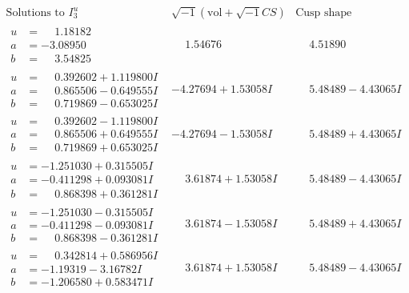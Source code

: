 \documentclass[1p]{elsarticle_modified}
\theoremstyle{definition}
\newcommand{\I}{\sqrt{-1}}
\begin{document}
$$\begin{array}{c|c|c}  
\text{Solutions to }I^u_{3}& \I (\text{vol} + \sqrt{-1}CS) & \text{Cusp shape}\\
 \hline 
\begin{aligned}
u &= \phantom{-}1.18182\phantom{ +0.000000I} \\
a &= -3.08950\phantom{ +0.000000I} \\
b &= \phantom{-}3.54825\phantom{ +0.000000I}\end{aligned}
 & \phantom{-}1.54676\phantom{ +0.000000I} & \phantom{-}4.51890\phantom{ +0.000000I} \\ \hline\begin{aligned}
u &= \phantom{-}0.392602 + 1.119800 I \\
a &= \phantom{-}0.865506 - 0.649555 I \\
b &= \phantom{-}0.719869 - 0.653025 I\end{aligned}
 & -4.27694 + 1.53058 I & \phantom{-}5.48489 - 4.43065 I \\ \hline\begin{aligned}
u &= \phantom{-}0.392602 - 1.119800 I \\
a &= \phantom{-}0.865506 + 0.649555 I \\
b &= \phantom{-}0.719869 + 0.653025 I\end{aligned}
 & -4.27694 - 1.53058 I & \phantom{-}5.48489 + 4.43065 I \\ \hline\begin{aligned}
u &= -1.251030 + 0.315505 I \\
a &= -0.411298 + 0.093081 I \\
b &= \phantom{-}0.868398 + 0.361281 I\end{aligned}
 & \phantom{-}3.61874 + 1.53058 I & \phantom{-}5.48489 - 4.43065 I \\ \hline\begin{aligned}
u &= -1.251030 - 0.315505 I \\
a &= -0.411298 - 0.093081 I \\
b &= \phantom{-}0.868398 - 0.361281 I\end{aligned}
 & \phantom{-}3.61874 - 1.53058 I & \phantom{-}5.48489 + 4.43065 I \\ \hline\begin{aligned}
u &= \phantom{-}0.342814 + 0.586956 I \\
a &= -1.19319 - 3.16782 I \\
b &= -1.206580 + 0.583471 I\end{aligned}
 & \phantom{-}3.61874 + 1.53058 I & \phantom{-}5.48489 - 4.43065 I \\ \hline\begin{aligned}

\end{aligned}
\end{array}$$
\end{document}

